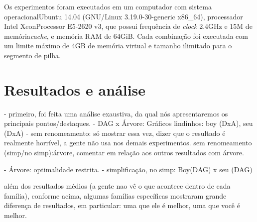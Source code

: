 
Os experimentos foram executados em um computador com sistema operacional\break Ubuntu 14.04 (GNU/Linux 3.19.0-30-generic x86\_64), processador Intel\textsuperscript{\textregistered} Xeon\textsuperscript{\textregistered}\break Processor E5-2620 v3, que possui frequência de \textit{clock} 2.4GHz e 15M de memória\break \textit{cache}, e memória RAM de 64GiB. Cada combinação foi executada com um limite máximo de 4GB de memória virtual e tamanho ilimitado para o segmento de pilha.

\section{Resultados e análise}

- primeiro, foi feita uma análise exaustiva, da qual nós apresentaremos os principais pontos/destaques.
- DAG x Árvore: Gráficos lindinhos: boy (DxA), seu (DxA)
- sem renomeamento: só mostrar essa vez, dizer que o resultado é realmente horrível, a gente não usa nos demais experimentos.
sem renomeamento (simp/no simp):árvore, comentar em relação aos outros resultados com árvore.


- Árvore: optimalidade restrita.
- simplificação, no simp: Boy(DAG) x seu (DAG)

além dos resultados médios (a gente nao vê o que acontece dentro de cada família), conforme acima, algumas famílias específicas mostraram grande diferença de resultados, em particular: uma que ele é melhor, uma que você é melhor.







